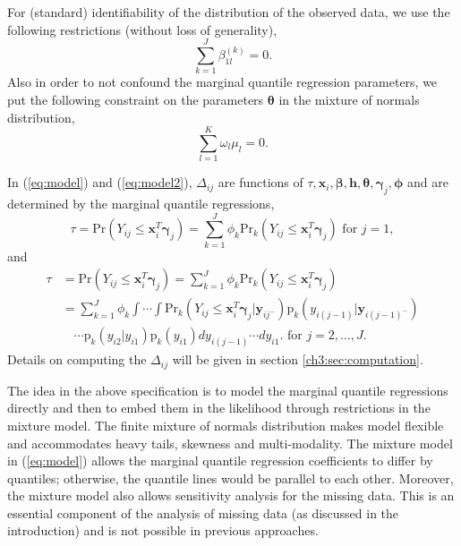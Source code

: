 \documentclass[useAMS,usenatbib,referee]{biom}
\newcommand{\pr}{\mbox{p}}
\newcommand{\prob}{\mbox{Pr}}
\begin{document}
For (standard) identifiability of the distribution of the observed data, we use the
following restrictions (without loss of generality),
\begin{displaymath}
 \sum_{k=1}^J \beta_{1l}^{(k)} = 0.
\end{displaymath}
Also in order to not confound the marginal quantile regression parameters,
we put the following constraint on the parameters $\bm \theta$ in the mixture of normals distribution,
\begin{displaymath}
\sum_{l= 1}^K \omega_{l}\mu_{l} = 0.
\end{displaymath}

In (\ref{eq:model}) and (\ref{eq:model2}), $\Delta_{ij}$ are functions of $\tau, \bm x_{i},
\bm \beta, \bm h, \bm \theta, \bm \gamma_j, \bm \phi$ and are determined by the marginal
quantile regressions,
\begin{equation}
  \label{eq:deltaeqn1}
  \tau = \prob (Y_{ij} \leq \bm x_{i}^T \bm \gamma_j ) = \sum_{k=1}^J
  \phi_k\prob_k (Y_{ij} \leq \bm x_{i}^T \bm \gamma_j ) \mbox{  for  } j = 1,
\end{equation}
and
\begin{align}\label{eq:deltaeqn2}
  \tau &= \prob (Y_{ij} \leq \bm x_{i}^{T} \bm \gamma_j ) =
  \sum_{k=1}^J
  \phi_k\prob_k (Y_{ij} \leq \bm x_{i}^{T} \bm \gamma_j ) \\
  & = \sum_{k=1}^J \phi_k \int\cdots \int \prob_k (Y_{ij} \leq \bm
  x_{i}^{T} \bm \gamma_j | \bm y_{ij^{-}}
  ) \pr_k (y_{i(j-1)}| \bm y_{i(j-1)^{-}})  \nonumber \\
  & \quad \cdots \pr_k (y_{i2}| y_{i1}) \pr_k(y_{i1})
  dy_{i(j-1)}\cdots dy_{i1}.  \mbox{  for  } j = 2, \ldots, J .\nonumber
\end{align}
Details on computing the $\Delta_{ij}$ will be given in section
\ref{ch3:sec:computation}.

The idea in the above specification is to model the marginal quantile regressions directly and then to embed them in the likelihood through restrictions in the mixture model.
The finite mixture of normals distribution makes model flexible and accommodates heavy tails, skewness and multi-modality.
The mixture model in (\ref{eq:model}) allows the marginal quantile regression coefficients to differ by quantiles; otherwise, the quantile lines would be parallel to each other.
Moreover, the mixture model also allows sensitivity analysis for the missing data.
This is an essential component of the analysis of missing data (as discussed in the introduction) and is not possible in previous approaches.
\end{document}
